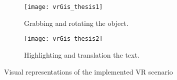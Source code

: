 \begin{figure}
  \centering
  \begin{subfigure}[b]{0.45\textwidth}
      \centering
      \texttt{[image: vrGis\_thesis1]}
      \caption{Grabbing and rotating the object.}
      \label{fig:vrGis_thesis1}
  \end{subfigure}
  \hfill
  \begin{subfigure}[b]{0.45\textwidth}
      \centering
      \texttt{[image: vrGis\_thesis2]}
      \caption{Highlighting and translation the text.}
      \label{fig:vrGis_thesis2}
  \end{subfigure}
     \caption{Visual representations of the implemented \gls{VR} scenario}
     \label{fig:vrGis_thesis}
\end{figure}







